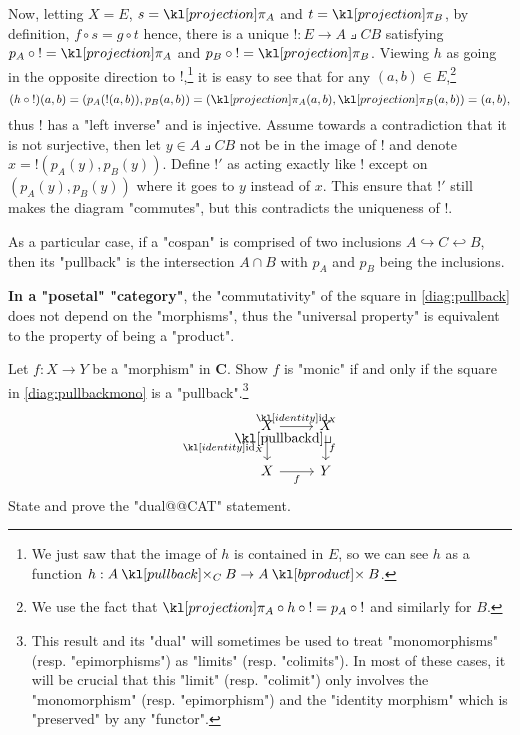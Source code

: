 \documentclass[main.tex]{subfiles}
\begin{document}
\begin{exmp}[$\catSet$]
    Now, letting $X= E$, $s = \projection_A$ and $t = \projection_B$, by definition, $f \circ s = g \circ t$ hence, there is a unique $!: E \rightarrow A\pullback{C} B$ satisfying $p_A \circ {!} = \projection_A$ and $p_B \circ {!} = \projection_B$. Viewing $h$ as going in the opposite direction to $!$,\footnote{We just saw that the image of $h$ is contained in $E$, so we can see $h$ as a function $h: A \pullback{C} B \rightarrow A\product B$.} it is easy to see that for any $(a,b) \in E$,\footnote{We use the fact that $\projection_A \circ h \circ {!} = p_A \circ {!}$ and similarly for $B$.} \[(h\circ {!})(a,b) = (p_A(!(a,b)), p_B(a,b)) = (\projection_A(a,b), \projection_B(a,b)) = (a,b),\] thus $!$ has a "left inverse" and is injective. Assume towards a contradiction that it is not surjective, then let $y \in A\pullback{C} B$ not be in the image of $!$ and denote $x = !(p_A(y), p_B(y))$. Define $!'$ as acting exactly like $!$ except on $(p_A(y),p_B(y))$ where it goes to $y$ instead of $x$. This ensure that $!'$ still makes the diagram "commutes", but this contradicts the uniqueness of $!$.

    As a particular case, if a "cospan" is comprised of two inclusions $A \hookrightarrow C \hookleftarrow B$, then its "pullback" is the intersection $A \cap B$ with $p_A$ and $p_B$ being the inclusions.
\end{exmp}
\begin{exmps}
    \textbf{In a "posetal" "category"}, the "commutativity" of the square in \eqref{diag:pullback} does not depend on the "morphisms", thus the "universal property" is equivalent to the property of being a "product". %
\end{exmps}
\begin{exer}\label{exer:limits:pullbackmono}
    Let $f: X \rightarrow Y$ be a "morphism" in $\mathbf{C}$. Show $f$ is "monic" if and only if the square in \eqref{diag:pullbackmono} is a "pullback".\footnote{This result and its "dual" will sometimes be used to treat "monomorphisms" (resp. "epimorphisms") as "limits" (resp. "colimits"). In most of these cases, it will be crucial that this "limit" (resp. "colimit") only involves the "monomorphism" (resp. "epimorphism") and the "identity morphism" which is "preserved" by any "functor".}
    \begin{equation}\label{diag:pullbackmono}
        \begin{tikzcd} %
            X & X \\
            X & Y
            \arrow["{\id_X}"', from=1-1, to=2-1]
            \arrow["f"', from=2-1, to=2-2]
            \arrow["{\id_X}", from=1-1, to=1-2]
            \arrow["f", from=1-2, to=2-2]
            \arrow["\pullbackd"{anchor=center, pos=0.125}, draw=none, from=1-1, to=2-2]
        \end{tikzcd}
    \end{equation}
    State and prove the "dual@@CAT" statement.
\end{exer}
\end{document}
